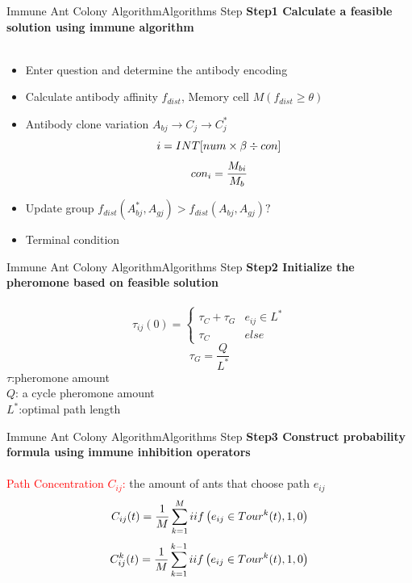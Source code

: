 \begin{frame}{Immune Ant Colony Algorithm}{Algorithms Step}
\large \textbf{Step1 Calculate a feasible solution using immune algorithm}\\~\\
\begin{itemize}
\item{Enter question and determine the antibody encoding}
\item{Calculate antibody affinity $f_{dist}$, Memory cell $M(f_{dist}\geqslant\theta)$}
\item{Antibody clone variation \qquad $A_{bj}\rightarrow C_j \rightarrow C_j^*$}
\begin{equation}\small{
i=INT[num \times \beta \div con]}
\end{equation}
\begin{equation}\small{
con_i=\frac{M_{bi}}{M_{b}} }
\end{equation}
\item{Update group \qquad \small{$f_{dist}(A_{bj}^*,A_{gj}) > f_{dist}(A_{bj},A_{gj}) ?$}} 
\item{Terminal condition}
\end{itemize}
\end{frame}

\begin{frame}{Immune Ant Colony Algorithm}{Algorithms Step}
\large \textbf{Step2 Initialize the pheromone based on feasible solution}\\~\\
\begin{equation}
\tau_{ij}(0)=
\begin{cases}
\tau_C +\tau_G & e_{ij} \in L^* \\
\tau_C & else
\end{cases}
\end{equation}
\begin{equation}
\tau_G = \frac{Q}{L^*}
\end{equation}
\centering \small{
{$\tau$:pheromone amount}\\ {$Q$: a cycle pheromone amount}\\ {$L^*$:optimal path length}
}
\end{frame}

\begin{frame}{Immune Ant Colony Algorithm}{Algorithms Step}
\large \textbf{Step3 Construct probability formula using immune inhibition operators}\\~\\
\centering \small { \textcolor{red}{Path Concentration $C_{ij}$:} the amount of ants that choose path $e_{ij}$}
\begin{equation}\small{
C_{ij}(t) = \frac{1}{M} \sum\limits_{k=1}^{M}iif \left(e_{ij} \in Tour^k(t),1,0\right)}
\end{equation}
\begin{equation}\small{
C_{ij}^k(t) = \frac{1}{M} \sum\limits_{k=1}^{k-1}iif \left(e_{ij} \in Tour^k(t),1,0\right)}
\end{equation}
\end{frame}

